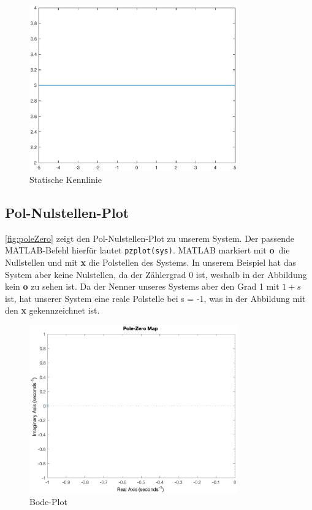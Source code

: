 \begin{figure}[H]
    \label{fig:staticCurve}
    \centering
    \includegraphics[width=0.8\textwidth]{Bilder/StaticCurvePT1Tt.eps}
    \caption{Statische Kennlinie}
 \end{figure}

\subsection{Pol-Nulstellen-Plot}
\autoref{fig:poleZero} zeigt den Pol-Nulstellen-Plot zu unserem System. Der passende MATLAB-Befehl hierfür lautet \texttt{pzplot(sys)}. MATLAB markiert mit \textbf{o} die Nullstellen und mit \textbf{x} die Polstellen des Systems. In unserem Beispiel hat das System aber keine Nulstellen, da der Zählergrad 0 ist, weshalb in der Abbildung kein \textbf{o} zu sehen ist. Da der Nenner unseres Systems aber den Grad 1 mit $1 + s$ ist, hat unserer System eine reale Polstelle bei s = -1, was in der Abbildung mit den \textbf{x} gekennzeichnet ist.

\begin{figure}[H]
    \label{fig:poleZero}
    \centering
    \includegraphics[width=0.8\textwidth]{Bilder/PoleZeroPT1Tt.eps}
    \caption{Bode-Plot}
 \end{figure}
